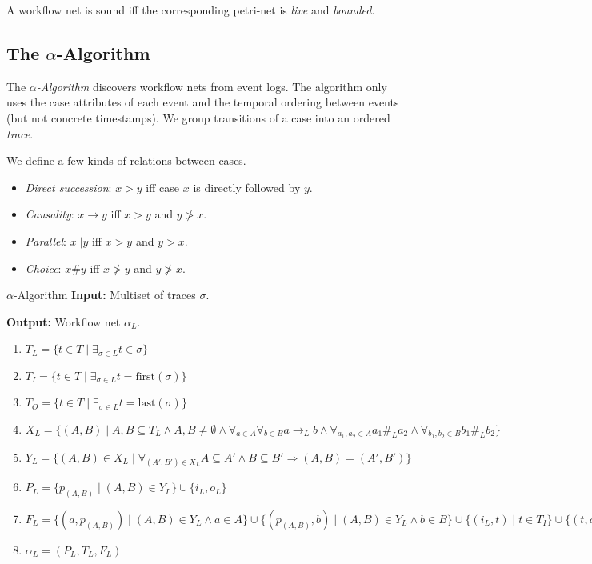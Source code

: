 \documentclass[english]{panikzettel}
\begin{document}
A workflow net is sound iff the corresponding petri-net is \emph{live} and \emph{bounded}.

\subsection[The Alpha-Algorithm]{The $\alpha$-Algorithm}

The \emph{$\alpha$-Algorithm} discovers workflow nets from event logs.
The algorithm only uses the case attributes of each event and the temporal ordering between events (but not concrete timestamps).
We group transitions of a case into an ordered \emph{trace}.

We define a few kinds of relations between cases.
\begin{itemize}
    \item \emph{Direct succession}: $x > y$ iff case $x$ is directly followed by $y$.
    \item \emph{Causality}: $x \rightarrow y$ iff $x > y$ and $y \not> x$.
    \item \emph{Parallel}: $x||y$ iff $x > y$ and $y > x$.
    \item \emph{Choice}: $x \# y$ iff $x \not> y$ and $y \not> x$.
\end{itemize}

%

\begin{algo}{$\alpha$-Algorithm}
\textbf{Input:} Multiset of traces $\sigma$.

\textbf{Output:} Workflow net $\alpha_L$.
\tcblower
\begin{enumerate}
    \item $T_L=\{t \in T \mid \exists_{\sigma \in L} t \in \sigma\}$
    \item $T_I=\{t \in T \mid \exists_{\sigma \in L} t = \text{first}(\sigma)\}$
    \item $T_O=\{t \in T \mid \exists_{\sigma \in L} t = \text{last}(\sigma)\}$
    \item $X_L=\{ (A,B) \mid A,B \subseteq T_L \land A,B \neq \emptyset \land \forall_{a \in A} \forall_{b \in B} a \rightarrow_L b \land \forall_{a_1,a_2 \in A} a_1\#_L a_2 \land \forall_{b_1,b_2 \in B} b_1\#_L b_2 \}$
    \item $Y_L=\{ (A,B) \in X_L \mid \forall_{(A',B') \in X_L} A \subseteq A' \land B \subseteq B' \Rightarrow (A,B) = (A',B') \}$
    \item $P_L=\{ p_{(A,B)} \mid (A,B) \in Y_L \} \cup \{i_L,o_L\}$
    \item $F_L=\{ (a,p_{(A,B)}) \mid (A,B) \in Y_L \land a \in A \} \cup \{ (p_{(A,B)},b) \mid (A,B) \in Y_L \land b \in B \} \cup \{ (i_L,t) \mid t \in T_I \} \cup \{ (t,o_L) \mid t \in T_O \}$
    \item $\alpha_L = (P_L,T_L,F_L)$
\end{enumerate}
\end{algo}
\end{document}
